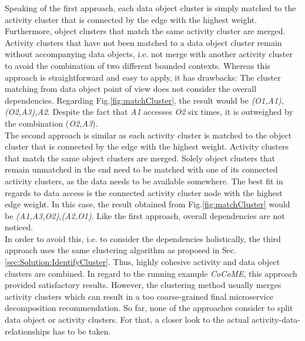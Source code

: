 \noindent
Speaking of the first approach, each data object cluster is simply matched to the activity cluster that is connected by the edge with the highest weight. Furthermore, object clusters that match the same activity cluster are merged. Activity clusters that have not been matched to a data object cluster remain without accompanying data objects, i.e. not merge with another activity cluster to avoid the combination of two different bounded contexts. Whereas this approach is straightforward and easy to apply, it has drawbacks: The cluster matching from data object point of view does not consider the overall dependencies. Regarding Fig.\ref{fig:matchCluster}, the result would be \textit{(O1,A1),(O2,A3),A2}. Despite the fact that \textit{A1} accesses \textit{O2} six times, it is outweighed by the combination (\textit{O2,A3}).  \\
The second approach is similar as each activity cluster is matched to the object cluster that is connected by the edge with the highest weight. Activity clusters that match the same object clusters are merged. Solely object clusters that remain unmatched in the end need to be matched with one of its connected activity clusters, as the data needs to be available somewhere. The best fit in regards to data access is the connected activity cluster node with the highest edge weight. In this case, the result obtained from Fig.\ref{fig:matchCluster} would be \textit{(A1,A3,O2),(A2,O1)}. Like the first approach, overall dependencies are not noticed. \\
In order to avoid this, i.e. to consider the dependencies holistically, the third approach uses the same clustering algorithm as proposed in Sec.\ref{sec:Solution:IdentifyCluster}. Thus, highly cohesive activity and data object clusters are combined. In regard to the running example \textit{CoCoME}, this approach provided satisfactory results. However, the clustering method usually merges activity clusters which can result in a too coarse-grained final microservice decomposition recommendation. So far, none of the approaches consider to split data object or activity clusters. For that, a closer look to the actual activity-data-relationships has to be taken. \\
